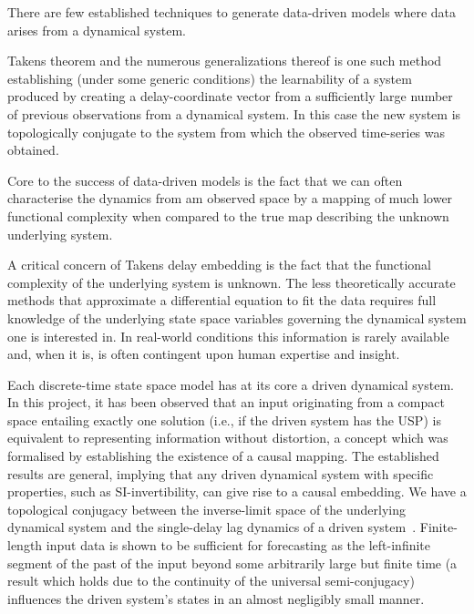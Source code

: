 
There are few established techniques to generate data-driven models where data arises from a dynamical system.

Takens theorem and the numerous generalizations thereof is one such method establishing (under some generic conditions) the learnability of a system produced by creating a delay-coordinate vector from a sufficiently large number of previous observations from a dynamical system. 
In this case the new system is topologically conjugate to the system from which the observed time-series was obtained.

Core to the success of data-driven models is the fact that we can often characterise the dynamics from am observed space by a mapping of much lower functional complexity when compared to the true map describing the unknown underlying system. 

A critical concern of Takens delay embedding is the fact that the functional complexity of the underlying system is unknown.
The less theoretically accurate methods that approximate a differential equation to fit the data requires full knowledge of the underlying state space variables governing the dynamical system one is interested in. 
In real-world conditions this information is rarely available and, when it is, is often contingent upon human expertise and insight. 

Each discrete-time state space model has at its core a driven dynamical system. 
In this project, it has been observed that an input originating from a compact space entailing exactly one solution (i.e., if the driven system has the USP) is equivalent to representing information without distortion, a concept which was formalised by establishing the existence of a causal mapping. 
The established results are general, implying that any driven dynamical system with specific properties, such as SI-invertibility, can give rise to a causal embedding. 
We have a topological conjugacy between the inverse-limit space of the underlying dynamical system and the single-delay lag dynamics of a driven system~\cite{manjunath2013echo}.
Finite-length input data is shown to be sufficient for forecasting as the left-infinite segment of the past of the input beyond some arbitrarily large but finite time (a result which holds due to the continuity of the universal semi-conjugacy) influences the driven system's states in an almost negligibly small manner.

